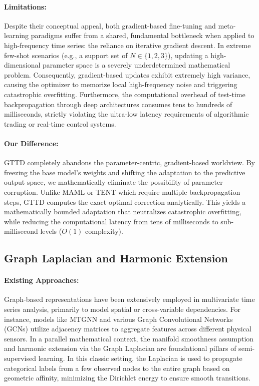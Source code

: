 \documentclass{article}
\begin{document}
	\paragraph{Limitations:} Despite their conceptual appeal, both gradient-based fine-tuning and meta-learning paradigms suffer from a shared, fundamental bottleneck when applied to high-frequency time series: the reliance on iterative gradient descent\cite{karmanov2024efficient, shin2024tta, jia2024tinytta, wang2025test}. In extreme few-shot scenarios (e.g., a support set of $N \in \{1, 2, 3\}$), updating a high-dimensional parameter space is a severely underdetermined mathematical problem. Consequently, gradient-based updates exhibit extremely high variance, causing the optimizer to memorize local high-frequency noise and triggering catastrophic overfitting. Furthermore, the computational overhead of test-time backpropagation through deep architectures consumes tens to hundreds of milliseconds, strictly violating the ultra-low latency requirements of algorithmic trading or real-time control systems\cite{karmanov2024efficient, jia2024tinytta, wang2025test}.
	
	\paragraph{Our Difference:} GTTD completely abandons the parameter-centric, gradient-based worldview. By freezing the base model's weights and shifting the adaptation to the predictive output space, we mathematically eliminate the possibility of parameter corruption. Unlike MAML or TENT which require multiple backpropagation steps, GTTD computes the exact optimal correction analytically. This yields a mathematically bounded adaptation that neutralizes catastrophic overfitting, while reducing the computational latency from tens of milliseconds to sub-millisecond levels ($O(1)$ complexity).
	
	\subsection{Graph Laplacian and Harmonic Extension}
	\paragraph{Existing Approaches:} Graph-based representations have been extensively employed in multivariate time series analysis, primarily to model spatial or cross-variable dependencies\cite{marisca2024graph}. For instance, models like MTGNN\cite{wu2020connecting} and various Graph Convolutional Networks (GCNs)\cite{kipf2016semi} utilize adjacency matrices to aggregate features across different physical sensors. In a parallel mathematical context, the manifold smoothness assumption and harmonic extension via the Graph Laplacian are foundational pillars of semi-supervised learning\cite{zhu2003semi}. In this classic setting, the Laplacian is used to propagate categorical labels from a few observed nodes to the entire graph based on geometric affinity, minimizing the Dirichlet energy to ensure smooth transitions.
	
\end{document}
